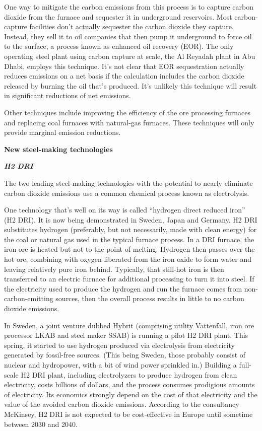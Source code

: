 \documentclass[
]{book}
\begin{document}
One way to mitigate the carbon emissions from this process is to capture carbon dioxide from the furnace and sequester it in underground reservoirs.
Most carbon-capture facilities don't actually sequester the carbon dioxide they capture. Instead, they sell it to oil companies that then pump it underground to force oil to the surface, a process known as enhanced oil recovery (EOR).
The only operating steel plant using carbon capture at scale, the Al Reyadah plant in Abu Dhabi, employs this technique.
It's not clear that EOR sequestration actually reduces emissions on a net basis if the calculation includes the carbon dioxide released by burning the oil that's produced.
It's unlikely this technique will result in significant reductions of net emissions.

Other techniques include improving the efficiency of the ore processing furnaces and replacing coal furnaces with natural-gas furnaces. These techniques will only provide marginal emission reductions.

\textbf{New steel-making technologies}

\textbf{\emph{H2 DRI}}

The two leading steel-making technologies with the potential to nearly eliminate carbon dioxide emissions use a common chemical process known as electrolysis.

One technology that's well on its way is called ``hydrogen direct reduced iron'' (H2 DRI). It is now being demonstrated in Sweden, Japan and Germany. H2 DRI substitutes hydrogen (preferably, but not necessarily, made with clean energy) for the coal or natural gas used in the typical furnace process. In a DRI furnace, the iron ore is heated but not to the point of melting. Hydrogen then passes over the hot ore, combining with oxygen liberated from the iron oxide to form water and leaving relatively pure iron behind. Typically, that still-hot iron is then transferred to an electric furnace for additional processing to turn it into steel. If the electricity used to produce the hydrogen and run the furnace comes from non-carbon-emitting sources, then the overall process results in little to no carbon dioxide emissions.

In Sweden, a joint venture dubbed Hybrit (comprising utility Vattenfall, iron ore processor LKAB and steel maker SSAB) is running a pilot H2 DRI plant. This spring, it started to use hydrogen produced via electrolysis from electricity generated by fossil-free sources. (This being Sweden, those probably consist of nuclear and hydropower, with a bit of wind power sprinkled in.) Building a full-scale H2 DRI plant, including electrolyzers to produce hydrogen from clean electricity, costs billions of dollars, and the process consumes prodigious amounts of electricity. Its economics strongly depend on the cost of that electricity and the value of the avoided carbon dioxide emissions. According to the consultancy McKinsey, H2 DRI is not expected to be cost-effective in Europe until sometime between 2030 and 2040.
\end{document}
